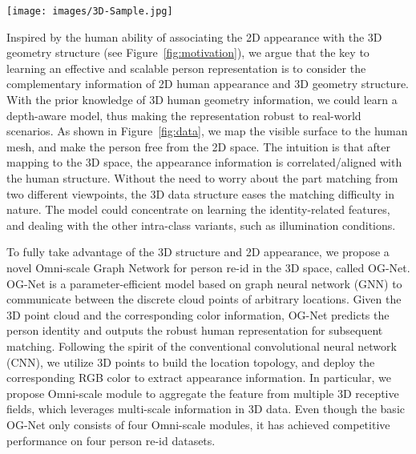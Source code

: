 \documentclass[journal]{IEEEtran}
\begin{document}
\begin{figure*}[t]
\begin{center}
     \texttt{[image: images/3D-Sample.jpg]}
\end{center} \caption{ Person is a 3D non-rigid object. In this work, we conduct the person re-identification in the 3D space, and learn a new type of robust re-id feature. Given one 2D image \textbf{(a)}, we first \textbf{(b)} estimate the 3D pose via the off-the-shelf model \cite{kanazawaHMR18}, followed by \textbf{(c)} mapping the RGB color of visible surfaces to corresponding points. The invisible parts are made transparent for visualization. \textbf{(d) The appearance information is aligned with the human structure. We make the person free from the 2D space, and thus ease the matching difficulty.} }
      \label{fig:data}
\end{figure*}

Inspired by the human ability of associating the 2D appearance with the 3D geometry structure (see Figure~\ref{fig:motivation}), we argue that the key to learning an effective and scalable person representation is to consider the complementary information of 2D human appearance and 3D geometry structure. With the prior knowledge of 3D human geometry information, we could learn a depth-aware model, thus making the representation robust to real-world scenarios. As shown in Figure~\ref{fig:data}, we map the visible surface to the human mesh, and make the person free from the 2D space. 
The intuition is that after mapping to the 3D space, the appearance information is correlated/aligned with the human structure.
Without the need to worry about the part matching from two different viewpoints, the 3D data structure eases the matching difficulty in nature. The model could concentrate on learning the identity-related features, and dealing with the other intra-class variants, such as illumination conditions. 

To fully take advantage of the 3D structure and 2D appearance, we propose a novel Omni-scale Graph Network for person re-id in the 3D space, called OG-Net. OG-Net is a parameter-efficient model based on graph neural network (GNN) to communicate between the discrete cloud points of arbitrary locations. Given the 3D point cloud and the corresponding color information, OG-Net predicts the person identity and outputs the robust human representation for subsequent matching. 
Following the spirit of the conventional convolutional neural network (CNN), we utilize 3D points to build the location topology, and deploy the corresponding RGB color to extract appearance information.  In particular, we propose Omni-scale module to aggregate the feature from multiple 3D receptive fields, which leverages multi-scale information in 3D data. Even though the basic OG-Net only consists of four Omni-scale modules, it has achieved competitive performance on four person re-id datasets. 
\end{document}
